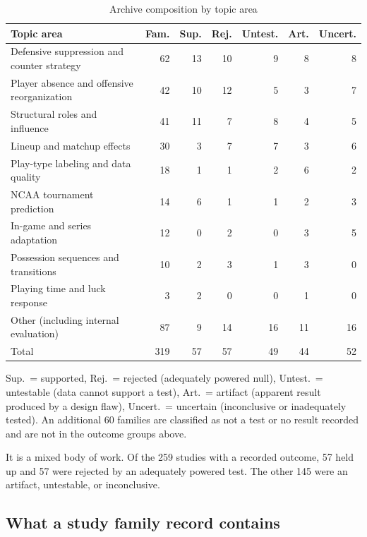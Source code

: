 \documentclass[11pt]{article}
\begin{document}
\begin{table}[ht]
\centering
\caption{Archive composition by topic area}
\label{tab:archive_topics}
\small
\begin{tabular}{lrrrrrr}
\toprule
Topic area & Fam. & Sup. & Rej. & Untest. & Art. & Uncert. \\
\midrule
Defensive suppression and counter strategy & 62 & 13 & 10 & 9 & 8 & 8 \\
Player absence and offensive reorganization & 42 & 10 & 12 & 5 & 3 & 7 \\
Structural roles and influence & 41 & 11 & 7 & 8 & 4 & 5 \\
Lineup and matchup effects & 30 & 3 & 7 & 7 & 3 & 6 \\
Play-type labeling and data quality & 18 & 1 & 1 & 2 & 6 & 2 \\
NCAA tournament prediction & 14 & 6 & 1 & 1 & 2 & 3 \\
In-game and series adaptation & 12 & 0 & 2 & 0 & 3 & 5 \\
Possession sequences and transitions & 10 & 2 & 3 & 1 & 3 & 0 \\
Playing time and luck response & 3 & 2 & 0 & 0 & 1 & 0 \\
Other (including internal evaluation) & 87 & 9 & 14 & 16 & 11 & 16 \\
\midrule
Total & 319 & 57 & 57 & 49 & 44 & 52 \\
\bottomrule
\end{tabular}

\vspace{0.4em}
\begin{minipage}{0.92\linewidth}\footnotesize
Sup.\ = supported, Rej.\ = rejected (adequately powered null), Untest.\ = untestable (data cannot support a test), Art.\ = artifact (apparent result produced by a design flaw), Uncert.\ = uncertain (inconclusive or inadequately tested). An additional 60 families are classified as not a test or no result recorded and are not in the outcome groups above.
\end{minipage}
\end{table}

It is a mixed body of work. Of the 259 studies with a recorded outcome, 57 held up and 57 were rejected by an adequately powered test. The other 145 were an artifact, untestable, or inconclusive.

\subsection{What a study family record contains}
\end{document}
